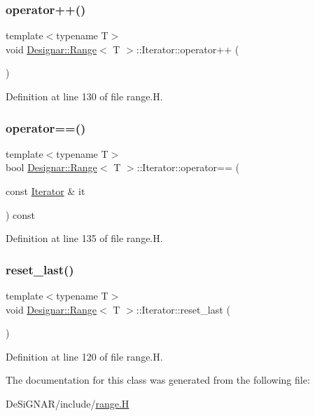 \subsubsection{\texorpdfstring{operator++()}{operator++()}}
{\footnotesize\ttfamily template$<$typename T$>$ \\
void \hyperlink{class_designar_1_1_range}{Designar\+::\+Range}$<$ T $>$\+::Iterator\+::operator++ (\begin{DoxyParamCaption}{ }\end{DoxyParamCaption})\hspace{0.3cm}{\ttfamily [inline]}}



Definition at line 130 of file range.\+H.

\mbox{\label{class_designar_1_1_range_1_1_iterator_a0c3ce6ecdc451e8f8f91d114485abb2b}} 
\subsubsection{\texorpdfstring{operator==()}{operator==()}}
{\footnotesize\ttfamily template$<$typename T$>$ \\
bool \hyperlink{class_designar_1_1_range}{Designar\+::\+Range}$<$ T $>$\+::Iterator\+::operator== (\begin{DoxyParamCaption}\item[{const \hyperlink{class_designar_1_1_range_1_1_iterator}{Iterator} \&}]{it }\end{DoxyParamCaption}) const\hspace{0.3cm}{\ttfamily [inline]}}



Definition at line 135 of file range.\+H.

\mbox{\label{class_designar_1_1_range_1_1_iterator_ae5a8045527f0582b9a0f126ccf50ae19}} 
\subsubsection{\texorpdfstring{reset\+\_\+last()}{reset\_last()}}
{\footnotesize\ttfamily template$<$typename T$>$ \\
void \hyperlink{class_designar_1_1_range}{Designar\+::\+Range}$<$ T $>$\+::Iterator\+::reset\+\_\+last (\begin{DoxyParamCaption}{ }\end{DoxyParamCaption})\hspace{0.3cm}{\ttfamily [inline]}}



Definition at line 120 of file range.\+H.



The documentation for this class was generated from the following file\+:\begin{DoxyCompactItemize}
\item 
De\+Si\+G\+N\+A\+R/include/\hyperlink{range_8_h}{range.\+H}\end{DoxyCompactItemize}
